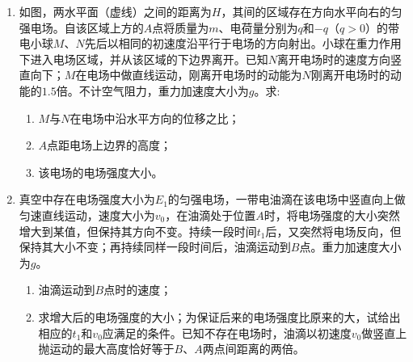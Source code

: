 \begin{enumerate}[leftmargin=0em]
\newpage 
\item
{}
如图，两水平面（虚线）之间的距离为$ H $，其间的区域存在方向水平向右的匀强电场。自该区域上方的$ A $点将质量为$ m $、电荷量分别为$ q $和$ -q $（$ q>0 $）的带电小球$ M $、$ N $先后以相同的初速度沿平行于电场的方向射出。小球在重力作用下进入电场区域，并从该区域的下边界离开。已知$ N $离开电场时的速度方向竖直向下；$ M $在电场中做直线运动，刚离开电场时的动能为$ N $刚离开电场时的动能的$ 1.5 $倍。不计空气阻力，重力加速度大小为$ g $。求:
\begin{enumerate}
\renewcommand{\labelenumi}{\arabic{enumi}.}
\item
$ M $与$ N $在电场中沿水平方向的位移之比；
\item 
$ A $点距电场上边界的高度；
\item 
该电场的电场强度大小。



\end{enumerate}
\begin{figure}[h!]
\flushright

\end{figure}



\newpage
\item
{}
真空中存在电场强度大小为$ E_{1} $的匀强电场，一带电油滴在该电场中竖直向上做匀速直线运动，速度大小为$ v_{0} $，在油滴处于位置$ A $时，将电场强度的大小突然增大到某值，但保持其方向不变。持续一段时间$ t_{1} $后，又突然将电场反向，但保持其大小不变；再持续同样一段时间后，油滴运动到$ B $点。重力加速度大小为$ g $。
\begin{enumerate}
\renewcommand{\labelenumi}{\arabic{enumi}.}
\item
油滴运动到$ B $点时的速度；
\item 
求增大后的电场强度的大小；为保证后来的电场强度比原来的大，试给出相应的$ t_{1} $和$ v_{0} $应满足的条件。已知不存在电场时，油滴以初速度$ v_{0} $做竖直上抛运动的最大高度恰好等于$ B $、$ A $两点间距离的两倍。


\end{enumerate}
\end{enumerate}
